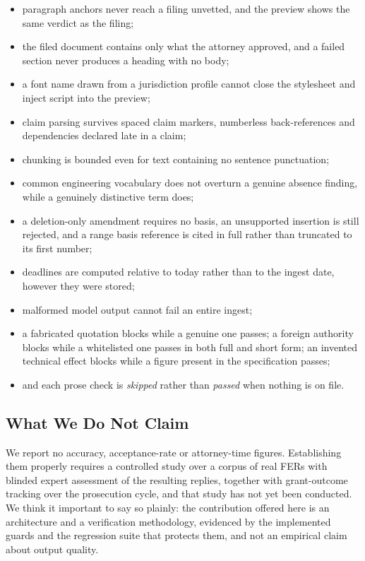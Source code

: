 \documentclass[conference]{IEEEtran}
\begin{document}
\begin{itemize}
\item paragraph anchors never reach a filing unvetted, and the preview shows the same verdict as the filing;
\item the filed document contains only what the attorney approved, and a failed section never produces a heading with no body;
\item a font name drawn from a jurisdiction profile cannot close the stylesheet and inject script into the preview;
\item claim parsing survives spaced claim markers, numberless back-references and dependencies declared late in a claim;
\item chunking is bounded even for text containing no sentence punctuation;
\item common engineering vocabulary does not overturn a genuine absence finding, while a genuinely distinctive term does;
\item a deletion-only amendment requires no basis, an unsupported insertion is still rejected, and a range basis reference is cited in full rather than truncated to its first number;
\item deadlines are computed relative to today rather than to the ingest date, however they were stored;
\item malformed model output cannot fail an entire ingest;
\item a fabricated quotation blocks while a genuine one passes; a foreign authority blocks while a whitelisted one passes in both full and short form; an invented technical effect blocks while a figure present in the specification passes;
\item and each prose check is \emph{skipped} rather than \emph{passed} when nothing is on file.
\end{itemize}

\subsection{What We Do Not Claim}

We report no accuracy, acceptance-rate or attorney-time figures. Establishing them properly requires a controlled study over a corpus of real FERs with blinded expert assessment of the resulting replies, together with grant-outcome tracking over the prosecution cycle, and that study has not yet been conducted. We think it important to say so plainly: the contribution offered here is an architecture and a verification methodology, evidenced by the implemented guards and the regression suite that protects them, and not an empirical claim about output quality.
\end{document}
